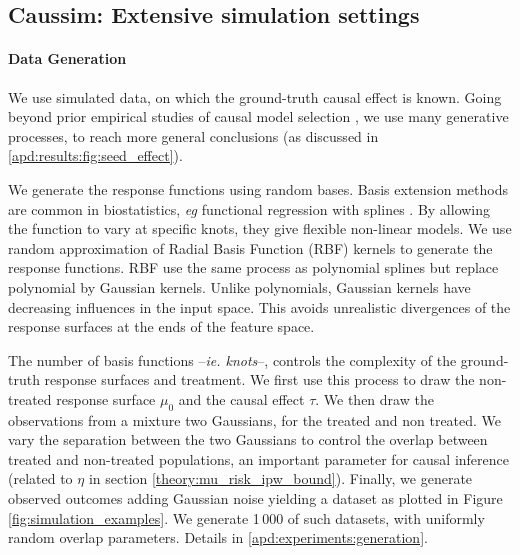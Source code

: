 \documentclass[french,12pt,twoside,a4paper]{book}
\begin{document}
\subsection{Caussim: Extensive simulation settings}\label{subsec:simulations}

\paragraph{Data Generation}

We use simulated data, on which the ground-truth causal effect is known. Going
beyond prior empirical studies of causal model selection
\citep{schuler_comparison_2018,alaa_validating_2019}, we use many
generative processes, to reach more general conclusions (as discussed
in \ref{apd:results:fig:seed_effect}).

We generate the response functions using random bases. Basis extension methods
are common in biostatistics, \emph{eg} functional regression with splines
\citep{howe_splines_2011, perperoglou_review_2019}. By allowing the function to
vary at specific knots, they give flexible non-linear models. We use random approximation of Radial Basis Function (RBF) kernels
\citep{rahimi_random_2008} to generate the response functions. RBF use the same
process as polynomial splines but replace polynomial by Gaussian kernels. Unlike
polynomials, Gaussian kernels have decreasing influences in the input space.
This avoids unrealistic divergences of the response surfaces at the
ends of the feature space.

The number of basis functions --\emph{ie. knots}--, controls the complexity of
the ground-truth response surfaces and treatment. We first use this process to
draw the non-treated response surface $\mu_0$ and the causal effect $\tau$. We
then draw the observations from a mixture two Gaussians, for the treated and non
treated. We vary the separation between the two Gaussians to control the
overlap between treated and non-treated populations, an important parameter
for causal inference (related to $\eta$ in section
\ref{theory:mu_risk_ipw_bound}). Finally, we generate observed outcomes
adding Gaussian noise yielding a dataset as plotted in Figure \ref{fig:simulation_examples}. We generate 1\,000 of such datasets, with
uniformly random overlap parameters. Details in
\ref{apd:experiments:generation}.

%
\end{document}
